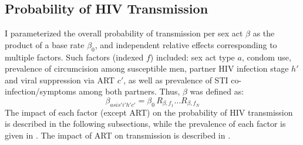 \subsection{Probability of HIV Transmission}\label{model.par.beta}
I parameterized the overall probability of transmission per sex act $\beta$ as
the product of a base rate $\beta_0$,
and independent relative effects corresponding to multiple factors.
Such factors (indexed $f$) included:
sex act type $a$, condom use, prevalence of circumcision among susceptible men,
partner HIV infection stage $h'$ and viral suppression via ART $c'$,
as well as prevalence of STI co-infection/symptoms among both partners.
Thus, $\beta$ was defined as:
\begin{equation}\label{eq:model.beta}
  \beta_{asis'i'h'c'} = \beta_0 \, R_{\beta,f_1} \dots R_{\beta,f_N}
\end{equation}
The impact of each factor (except ART) on the probability of HIV transmission
is described in the following subsections,
while the prevalence of each factor is given in .
The impact of ART on transmission is described in .

